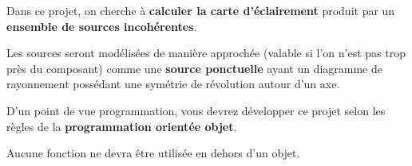 Dans ce projet, on cherche à \textbf{calculer la carte d'éclairement} produit par un \textbf{ensemble de sources incohérentes}.

Les sources seront modélisées de manière approchée (valable si l'on n'est pas trop près du composant) comme une \textbf{source ponctuelle} ayant un diagramme de rayonnement possédant une symétrie de révolution autour d'un axe.



\medskip

D'un point de vue programmation, vous devrez développer ce projet selon les règles de la \textbf{programmation orientée objet}.

Aucune fonction ne devra être utilisée en dehors d'un objet.